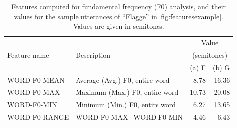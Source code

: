 \begin{table}[htb]
		\centering
		\caption[Features computed for fundamental frequency (F0) analysis]{Features computed for fundamental frequency (F0) analysis, and their values for the sample utterances of ``Flagge'' in \cref{fig:featuresexample}. Values are given in semitones.}
		{\renewcommand{\arraystretch}{1.4}%
		\begin{tabularx}{\textwidth}{p{}Xrr}
		\toprule
		\multirow{3}{*}{Feature name} 
									& \multirow{3}{*}{Description}
																	& \multicolumn{2}{c}{Value} \\
									&								& \multicolumn{2}{c}{(semitones)} \\							
					  				&																	&  (a) F		
					  																											& (b) G
					  																																\\
		\midrule
		WORD-F0-MEAN	& Average (Avg.) F0, entire word	 				& 8.78		& 16.36\\
		WORD-F0-MAX	& Maximum (Max.) F0, entire word				& 10.73	& 20.08\\
		WORD-F0-MIN		& Minimum (Min.) F0, entire word				& 6.27		& 13.65\\
		WORD-F0-RANGE & WORD-F0-MAX$-$WORD-F0-MIN			& 4.46		& 6.43\\


\end{tabularx}}
\end{table}
